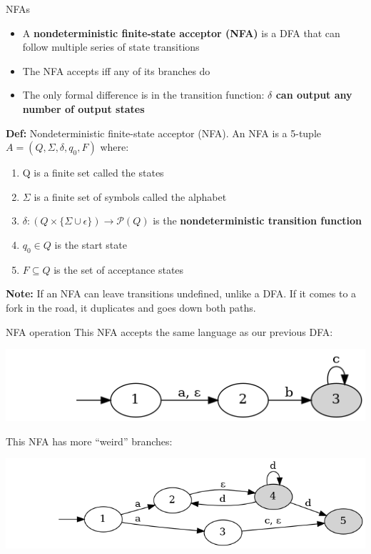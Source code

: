 \begin{frame}{NFAs}
\protect\hypertarget{nfas}{}
\begin{itemize}
\tightlist
\item
  A \textbf{nondeterministic finite-state acceptor (NFA)} is a DFA that
  can follow multiple series of state transitions
\item
  The NFA accepts iff any of its branches do
\item
  The only formal difference is in the transition function:
  \textbf{\(\delta\) can output any number of output states}
\end{itemize}

\textbf{Def:} Nondeterministic finite-state acceptor (NFA). An NFA is a
5-tuple \(A = (Q, \Sigma, \delta, q_0, F)\) where:

\begin{enumerate}
[1)]
\tightlist
\item
  Q is a finite set called the states
\item
  \(\Sigma\) is a finite set of symbols called the alphabet
\item
  \(\delta : (Q \times \{ \Sigma \cup \epsilon \}) \to \mathcal{P}(Q)\)
  is the \textbf{nondeterministic transition function}
\item
  \(q_0 \in Q\) is the start state
\item
  \(F \subseteq Q\) is the set of acceptance states
\end{enumerate}

\textbf{Note:} If an NFA can leave transitions undefined, unlike a DFA.
If it comes to a fork in the road, it duplicates and goes down both
paths.
\end{frame}

\begin{frame}{NFA operation}
\protect\hypertarget{nfa-operation}{}
This NFA accepts the same language as our previous DFA:

\includegraphics{figures/nfa_ex.png}

This NFA has more ``weird'' branches:

\includegraphics{figures/nfa_ex_2.png}
\end{frame}

